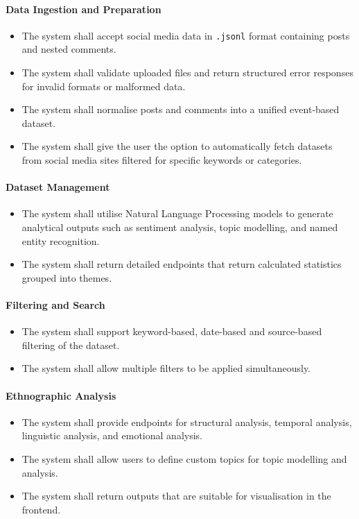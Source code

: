 \documentclass[12pt, a4paper]{article}
\begin{document}
\paragraph{Data Ingestion and Preparation}
\begin{itemize}
    \item The system shall accept social media data in \texttt{.jsonl} format containing posts and nested comments.
    \item The system shall validate uploaded files and return structured error responses for invalid formats or malformed data.
    \item The system shall normalise posts and comments into a unified event-based dataset.
    \item The system shall give the user the option to automatically fetch datasets from social media sites filtered for specific keywords or categories.
\end{itemize}

\paragraph{Dataset Management}
\begin{itemize}
    \item The system shall utilise Natural Language Processing models to generate analytical outputs such as sentiment analysis, topic modelling, and named entity recognition.
    \item The system shall return detailed endpoints that return calculated statistics grouped into themes.
\end{itemize}

\paragraph{Filtering and Search}
\begin{itemize}
    \item The system shall support keyword-based, date-based and source-based filtering of the dataset.
    \item The system shall allow multiple filters to be applied simultaneously.
\end{itemize}

\paragraph{Ethnographic Analysis}
\begin{itemize}
    \item The system shall provide endpoints for structural analysis, temporal analysis, linguistic analysis, and emotional analysis.
    \item The system shall allow users to define custom topics for topic modelling and analysis.
    \item The system shall return outputs that are suitable for visualisation in the frontend.
\end{itemize}
\end{document}
